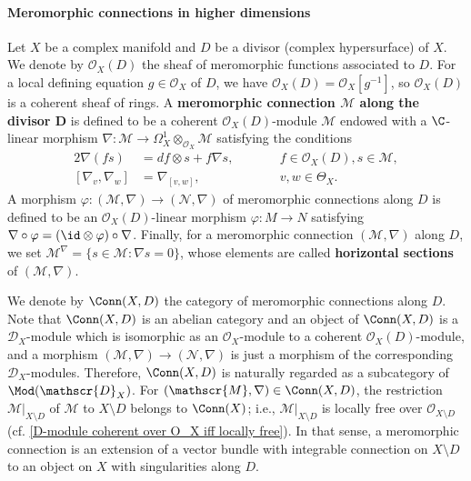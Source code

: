 \paragraph{Meromorphic connections in higher dimensions}
Let $X$ be a complex manifold and $D$ be a divisor (complex hypersurface) of $X$. We denote by $\mathscr{O}_X(D)$ the sheaf of meromorphic functions associated to $D$. For a local defining equation $g\in\mathscr{O}_X$ of $D$, we have $\mathscr{O}_X(D)=\mathscr{O}_X[g^{-1}]$, so $\mathscr{O}_X(D)$ is a coherent sheaf of rings. A \textbf{meromorphic connection $\mathscr{M}$ along the divisor $\bm{D}$} is defined to be a coherent $\mathscr{O}_X(D)$-module $\mathscr{M}$ endowed with a $\C$-linear morphism $\nabla:\mathscr{M}\to\Omega_X^1\otimes_{\mathscr{O}_X}\mathscr{M}$ satisfying the conditions
\begin{alignat}{2}
\nabla(fs)&=df\otimes s+f\nabla s,&\quad\quad&f\in\mathscr{O}_X(D),s\in\mathscr{M},\label{D-module mero conn def-1}\\
[\nabla_v,\nabla_w]&=\nabla_{[v,w]},&\quad\quad&v,w\in\Theta_X.\label{D-module mero conn def-2}
\end{alignat}
A morphism $\varphi:(\mathscr{M},\nabla)\to (\mathscr{N},\nabla)$ of meromorphic connections along $D$ is defined to be an $\mathscr{O}_X(D)$-linear morphism $\varphi:M\to N$ satisfying $\nabla\circ\varphi=(\id\otimes\varphi)\circ\nabla$. Finally, for a meromorphic connection $(\mathscr{M},\nabla)$ along $D$, we set $\mathscr{M}^\nabla=\{s\in\mathscr{M}:\nabla s=0\}$, whose elements are called \textbf{horizontal sections} of $(\mathscr{M},\nabla)$.\par
We denote by $\Conn(X,D)$ the category of meromorphic connections along $D$. Note that $\Conn(X,D)$ is an abelian category and an object of $\Conn(X,D)$ is a $\mathscr{D}_X$-module which is isomorphic as an $\mathscr{O}_X$-module to a coherent $\mathscr{O}_X(D)$-module, and a morphism $(\mathscr{M},\nabla)\to (\mathscr{N},\nabla)$ is just a morphism of the corresponding $\mathscr{D}_X$-modules. Therefore, $\Conn(X,D)$ is naturally regarded as a subcategory of $\Mod(\mathscr{D}_X)$. For $(\mathscr{M},\nabla)\in\Conn(X,D)$, the restriction $\mathscr{M}|_{X\setminus D}$ of $\mathscr{M}$ to $X\setminus D$ belongs to $\Conn(X)$; i.e., $\mathscr{M}|_{X\setminus D}$ is locally free over $\mathscr{O}_{X\setminus D}$ (cf. \cref{D-module coherent over O_X iff locally free}). In that sense, a meromorphic connection is an extension of a vector bundle with integrable connection on $X\setminus D$ to an object on $X$ with singularities along $D$.

